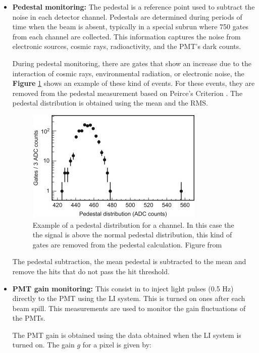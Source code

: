 \begin{itemize}
    \item \textbf{Pedestal monitoring:} The pedestal is a reference point used to subtract the noise in each detector channel. Pedestals are determined during periods of time when the beam is absent, typically in a special subrun where 750 gates from each channel are collected. This information captures the noise from electronic sources, cosmic rays, radioactivity, and the PMT's dark counts.

    During pedestal monitoring, there are gates that show an increase due to the interaction of cosmic rays, environmental radiation, or electronic noise, the \textbf{Figure} \ref{fig:MnvExp:MnvDetector:Calibration:InSitu:Pedestal} shows an example of these kind of events. For these events, they are removed from the pedestal measurement based on Peirce's Criterion \cite{PeirceCriterion}. The pedestal distribution is obtained using the mean and the RMS.

    \begin{figure}
        \centering
        \includegraphics{Figures/Chapter2/Pedestal.jpg}
        \caption{Example of a pedestal distribution for a channel. In this case the the signal is above the normal pedestal distribution, this kind of gates are removed from the pedestal calculation. Figure from \cite{MINERvA}}
        \label{fig:MnvExp:MnvDetector:Calibration:InSitu:Pedestal}
    \end{figure}
    The pedestal subtraction, the mean pedestal is subtracted to the mean and remove the hits that do not pass the hit threshold.

    
    \item \textbf{PMT gain monitoring:} This consist in to inject light pulses (0.5 Hz) directly to the PMT using the LI system. This is turned on ones after each beam spill. This measurements are used to monitor the gain fluctuations of the PMTs. 
    
    The PMT gain is obtained using the data obtained when the LI system is turned on. The gain $g$ for a pixel is given by:


\end{itemize}

